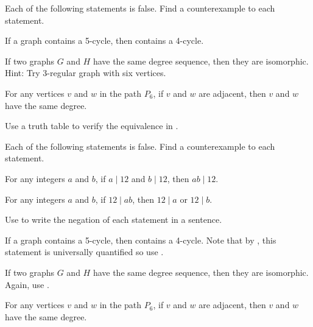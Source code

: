\begin{exer}[\exerP] %
\label{exer_cex_graphs_cond}
    Each of the following statements is false. Find a counterexample to each statement.
    \begin{exerpart}
        \item If a graph contains a 5-cycle, then contains a 4-cycle. 
        \item If two graphs $G$ and $H$ have the same degree sequence, then they are isomorphic.  Hint: Try 3-regular graph with six vertices.
        \item For any vertices $v$ and $w$ in the path $P_6$, if $v$ and $w$ are adjacent, then $v$ and $w$ have the same degree.
    \end{exerpart}
\end{exer}

\begin{exer}[\exerU] %
\label{exer_truthtable_neg_conditional}  
    Use a truth table to verify the equivalence in .
\end{exer}

\begin{exer}[\exerU] %
\label{exer_product_divides12}
    Each of the following statements is false. Find a counterexample to each statement.
    \begin{exerpart}
        \item For any integers $a$ and $b$, if $a \mid 12$ and $b \mid 12$, then $ab \mid 12$.
        \item For any integers $a$ and $b$, if $12 \mid ab$, then $12 \mid a$ or $12 \mid b$.
    \end{exerpart}
\end{exer}

\begin{exer}[\exerU] %
\label{exer_negation_ifthen_graphs}
    Use  to write the negation of each statement in a sentence.
        \begin{exerpart}
            \item If a graph contains a 5-cycle, then contains a 4-cycle. Note that by , this statement is universally quantified so use .
            \item If two graphs $G$ and $H$ have the same degree sequence, then they are isomorphic.  Again, use .
            \item For any vertices $v$ and $w$ in the path $P_6$, if $v$ and $w$ are adjacent, then $v$ and $w$ have the same degree.
        \end{exerpart}
\end{exer}

